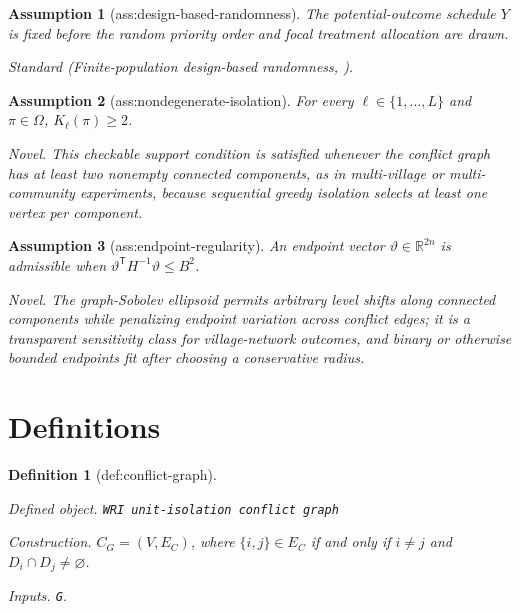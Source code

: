 \documentclass{article}
\newtheorem{assumption}{Assumption}
\newtheorem{definition}{Definition}
\begin{document}
\begin{assumption}[ass:design-based-randomness]\label{ass:design-based-randomness}
The potential-outcome schedule \(Y\) is fixed before the random priority order and focal treatment allocation are drawn.
\par\smallskip\noindent\emph{Standard} (Finite-population design-based randomness, \cite{AronowSamii2017}).
\end{assumption}

\begin{assumption}[ass:nondegenerate-isolation]\label{ass:nondegenerate-isolation}
For every \(\ell\in\{1,\ldots,L\}\) and \(\pi\in\Omega\), \(K_{\ell}(\pi)\ge 2\).
\par\smallskip\noindent\emph{Novel.} This checkable support condition is satisfied whenever the conflict graph has at least two nonempty connected components, as in multi-village or multi-community experiments, because sequential greedy isolation selects at least one vertex per component.
\end{assumption}

\begin{assumption}[ass:endpoint-regularity]\label{ass:endpoint-regularity}
An endpoint vector \(\vartheta\in\mathbb R^{2n}\) is admissible when \(\vartheta^{\mathsf T}H^{-1}\vartheta\le B^{2}\).
\par\smallskip\noindent\emph{Novel.} The graph-Sobolev ellipsoid permits arbitrary level shifts along connected components while penalizing endpoint variation across conflict edges; it is a transparent sensitivity class for village-network outcomes, and binary or otherwise bounded endpoints fit after choosing a conservative radius.
\end{assumption}

\section{Definitions}

\begin{definition}[def:conflict-graph]\label{def:conflict-graph}
\par\smallskip\noindent\emph{Defined object.} \texttt{WRI unit-\allowbreak{}isolation conflict graph}
\par\smallskip\noindent\emph{Construction.} \(C_G=(V,E_C)\), where \(\{i,j\}\in E_C\) if and only if \(i\ne j\) and \(D_i\cap D_j\ne\varnothing\).
\par\smallskip\noindent\emph{Inputs.} \texttt{G}.
\end{definition}
\end{document}
